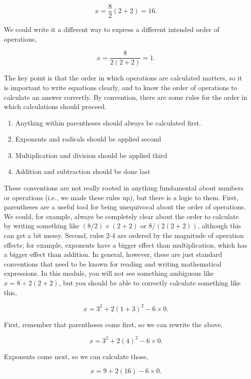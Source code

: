 \documentclass[
]{scrbook}
\providecommand{\tightlist}{%
  \setlength{\itemsep}{0pt}\setlength{\parskip}{0pt}}
\begin{document}
\[x = \frac{8}{2}\left(2 + 2\right) = 16.\]

We could write it a different way to express a different intended order of operations,

\[x = \frac{8}{2(2+2)} = 1.\]

The key point is that the order in which operations are calculated matters, so it is important to write equations clearly, and to know the order of operations to calculate an answer correctly.
By convention, there are some rules for the order in which calculations should proceed.

\begin{enumerate}
\def\labelenumi{\arabic{enumi}.}
\tightlist
\item
  Anything within parentheses should always be calculated first.
\item
  Exponents and radicals should be applied second
\item
  Multiplication and division should be applied third
\item
  Addition and subtraction should be done last
\end{enumerate}

These conventions are not really rooted in anything fundamental about numbers or operations (i.e., we made these rules up), but there is a logic to them.
First, parentheses are a useful tool for being unequivocal about the order of operations.
We could, for example, always be completely clear about the order to calculate by writing something like \((8/2) \times (2+2)\) or \(8 / (2(2 + 2))\), although this can get a bit messy.
Second, rules 2-4 are ordered by the magnitude of operation effects; for example, exponents have a bigger effect than multiplication, which has a bigger effect than addition.
In general, however, these are just standard conventions that need to be known for reading and writing mathematical expressions.
In this module, you will not see something ambiguous like \(x = 8 \div 2\left(2+2\right)\), but you should be able to correctly calculate something like this,

\[x = 3^{2} + 2\left(1 + 3\right)^{2} - 6 \times 0.\]

First, remember that parentheses come first, so we can rewrite the above,

\[x = 3^{2} + 2\left(4\right)^{2} - 6 \times 0.\]

Exponents come next, so we can calculate those,

\[x = 9 + 2\left(16\right) - 6 \times 0.\]
\end{document}
